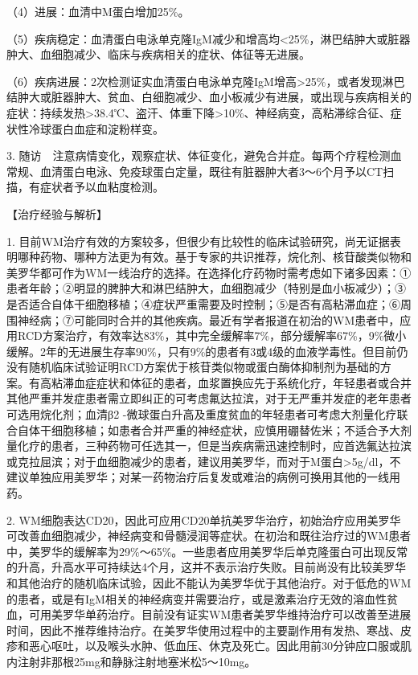 （4）进展：血清中M蛋白增加25\%。

（5）疾病稳定：血清蛋白电泳单克隆IgM减少和增高均<25\%，淋巴结肿大或脏器肿大、血细胞减少、临床与疾病相关的症状、体征等无进展。

（6）疾病进展：2次检测证实血清蛋白电泳单克隆IgM增高\textgreater{}25\%，或者发现淋巴结肿大或脏器肿大、贫血、白细胞减少、血小板减少有进展，或出现与疾病相关的症状：持续发热\textgreater{}38.4℃、盗汗、体重下降\textgreater{}10\%、神经病变，高粘滞综合征、症状性冷球蛋白血症和淀粉样变。

3.
随访　注意病情变化，观察症状、体征变化，避免合并症。每两个疗程检测血常规、血清蛋白电泳、免疫球蛋白定量，既往有脏器肿大者3～6个月予以CT扫描，有症状者予以血粘度检测。

【治疗经验与解析】

1.
目前WM治疗有效的方案较多，但很少有比较性的临床试验研究，尚无证据表明哪种药物、哪种方法更为有效。基于专家的共识推荐，烷化剂、核苷酸类似物和美罗华都可作为WM一线治疗的选择。在选择化疗药物时需考虑如下诸多因素：①患者年龄；②明显的脾肿大和淋巴结肿大，血细胞减少（特别是血小板减少）；③是否适合自体干细胞移植；④症状严重需要及时控制；⑤是否有高粘滞血症；⑥周围神经病；⑦可能同时合并的其他疾病。最近有学者报道在初治的WM患者中，应用RCD方案治疗，有效率达83\%，其中完全缓解率7\%，部分缓解率67\%，9\%微小缓解。2年的无进展生存率90\%，只有9\%的患者有3或4级的血液学毒性。但目前仍没有随机临床试验证明RCD方案优于核苷类似物或蛋白酶体抑制剂为基础的方案。有高粘滞血症症状和体征的患者，血浆置换应先于系统化疗，年轻患者或合并其他严重并发症患者需立即纠正的可考虑氟达拉滨，对于无严重并发症的老年患者可选用烷化剂；血清β{2}
-微球蛋白升高及重度贫血的年轻患者可考虑大剂量化疗联合自体干细胞移植；如患者合并严重的神经症状，应慎用硼替佐米；不适合予大剂量化疗的患者，三种药物可任选其一，但是当疾病需迅速控制时，应首选氟达拉滨或克拉屈滨；对于血细胞减少的患者，建议用美罗华，而对于M蛋白\textgreater{}5g/dl，不建议单独应用美罗华；对某一药物治疗后复发或难治的病例可换用其他的一线用药。

2.
WM细胞表达CD20，因此可应用CD20单抗美罗华治疗，初始治疗应用美罗华可改善血细胞减少，神经病变和骨髓浸润等症状。在初治和既往治疗过的WM患者中，美罗华的缓解率为29\%～65\%。一些患者应用美罗华后单克隆蛋白可出现反常的升高，升高水平可持续达4个月，这并不表示治疗失败。目前尚没有比较美罗华和其他治疗的随机临床试验，因此不能认为美罗华优于其他治疗。对于低危的WM的患者，或是有IgM相关的神经病变并需要治疗，或是激素治疗无效的溶血性贫血，可用美罗华单药治疗。目前没有证实WM患者美罗华维持治疗可以改善至进展时间，因此不推荐维持治疗。在美罗华使用过程中的主要副作用有发热、寒战、皮疹和恶心呕吐，以及喉头水肿、低血压、休克及死亡。因此用前30分钟应口服或肌内注射非那根25mg和静脉注射地塞米松5～10mg。


